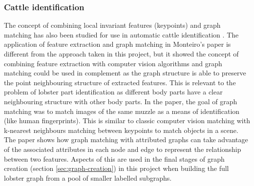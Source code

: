 \subsubsection{Cattle identification} \label{sec:cattle}
The concept of combining local invariant features (keypoints) and graph matching has also been studied for use in automatic cattle identification \cite{cattle}. The application of feature extraction and graph matching in Monteiro's paper is different from the approach taken in this project, but it showed the concept of combining feature extraction with computer vision algorithms and graph matching could be used in complement as the graph structure is able to preserve the point neighbouring structure of extracted features. This is relevant to the problem of lobster part identification as different body parts have a clear neighbouring structure with other body parts.
\n
In the paper, the goal of graph matching was to match images of the same muzzle as a means of identification (like human fingerprints). This is similar to classic computer vision matching with k-nearest neighbours matching between keypoints to match objects in a scene. The paper shows how graph matching with attributed graphs can take advantage of the associated attributes in each node and edge to represent the relationship between two features. Aspects of this are used in the final stages of graph creation (section \ref{sec:graph-creation}) in this project when building the full lobster graph from a pool of smaller labelled subgraphs. 

